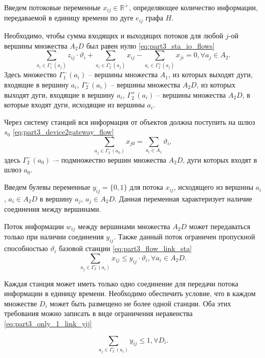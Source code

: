 Введем потоковые переменные $x_{ij} \in \mathbb{R}^+$, определяющее количество информации, передаваемой в единицу времени по дуге $e_{ij}$ графа $H$.

Необходимо, чтобы сумма входящих и выходящих потоков для любой $j$-ой вершины множества $A_2D$ был равен нулю \cref{eq:part3_sta_io_flows}
\begin{equation}\label{eq:part3_sta_io_flows} 
    \sum_{a_i \in \Gamma_1^-(a_j)} z_{ij} \cdot \vartheta_i + \sum_{a_i \in \Gamma_2^-(a_j)} x_{ij} -  \sum_{a_i \in \Gamma_2^+(a_j)} x_{ji} =0 ,\forall a_j \in A_2. 
\end{equation} 
Здесь множество $\Gamma_1^-(a_i)$ -- вершины множества $A_1$, из которых выходят дуги, входящие в вершину $a_i$, $\Gamma_2^-(a_i)$ -- вершины множества $A_2D$, из которых выходят дуги, входящие в  вершину $a_i$, $\Gamma_2^+(a_i)$ -- вершины множества $A_2D$, в которые входят дуги, исходящие из вершины  $a_i$.

Через систему станций вся информация от объектов  должна поступить на шлюз $s_0$ \cref{eq:part3_device2gateway_flow} 
\begin{equation}\label{eq:part3_device2gateway_flow}
    \sum_{a_j \in \Gamma_2^-(a_0)} x_{j0} = \sum_{a_i \in A_1} \vartheta_i,
\end{equation}
здесь $\Gamma_2^-(a_0)$ –- подмножество вершин множества $A_2D$, дуги которых входят в шлюз $a_0$.

Введем булевы переменные $y_{ij} = \{0,1\}$ для потока $x_{ij}$, исходящего из вершины $a_i$, $a_i \in A_2D$ в вершину $a_j$, $a_j \in A_2D$. Данная переменная характеризует наличие соединения между вершинами.

Поток информации $w_{ij}$ между вершинами множества $A_2D$ может передаваться только при наличии соединения $y_{ij}$. Также данный поток ограничен пропускной способностью $\vartheta_i$ базовой станции  \cref{eq:part3_flow_link_sta}
\begin{equation}\label{eq:part3_flow_link_sta}
    \sum_{a_j \in \Gamma_2^-(a_i)} x_{ij} \leqslant y_{ij} \cdot \vartheta_i, \forall a_i \in A_2D.
\end{equation}

Каждая станция может иметь только одно соединение для передачи потока информации в единицу времени. Необходимо обеспечить условие, что в каждом множестве $D_i$ может быть размещено не более одной станции. Оба этих требования можно записать в виде ограничения неравенства \cref{eq:part3_only_1_link_yij}

\begin{equation}\label{eq:part3_only_1_link_yij}
    \sum_{a_j \in \Gamma_2^-(a_i)} y_{ij} \leqslant 1, \forall D_i.
\end{equation}


